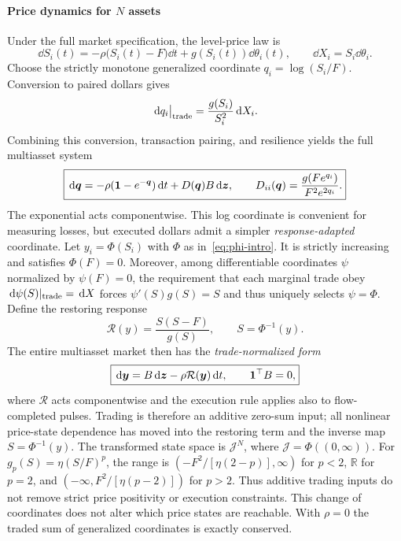 \documentclass[review,hidelinks,onefignum,onetabnum]{siamonline250211}
\begin{document}
\paragraph{Price dynamics for $N$ assets} Under the full market specification, the level-price law is
\begin{equation}\label{eq:level-dynamics}
\boxed{\dd S_i(t)=-\rho\big(S_i(t)-F\big)\dd t+g(S_i(t))\dd\theta_i(t),\qquad \dd X_i=S_i\dd\theta_i.}
\end{equation}
Choose the strictly monotone generalized coordinate $q_i=\log(S_i/F)$. Conversion to paired dollars gives
\begin{equation}\label{eq:log-impact}
\,\mathrm{d} q_i\big|_{\rm trade}=\frac{g(S_i)}{S_i^2}\,\mathrm{d} X_i.
\end{equation}
Combining this conversion, transaction pairing, and resilience yields the full multiasset system
\begin{equation}\label{eq:master}
\boxed{\,\mathrm{d}\bm q=-\rho(\mathbf{1}-e^{-\bm q})\,\mathrm{d} t+D(\bm q)B\,\mathrm{d}\bm z,\qquad
D_{ii}(\bm q)=\frac{g(Fe^{q_i})}{F^2e^{2q_i}}.}
\end{equation}
The exponential acts componentwise. This log coordinate is convenient for measuring losses, but executed dollars admit a simpler \emph{response-adapted} coordinate. Let $y_i=\Phi(S_i)$ with $\Phi$ as in~\eqref{eq:phi-intro}. It is strictly increasing and satisfies $\Phi(F)=0$. Moreover, among differentiable coordinates $\psi$ normalized by $\psi(F)=0$, the requirement that each marginal trade obey $\,\mathrm{d}\psi(S)|_{\rm trade}=\,\mathrm{d} X$ forces $\psi'(S)g(S)=S$ and thus uniquely selects $\psi=\Phi$. Define the restoring response
\[
\mathcal R(y)=\frac{S(S-F)}{g(S)},\qquad S=\Phi^{-1}(y).
\]
The entire multiasset market then has the \emph{trade-normalized form}
\begin{equation}\label{eq:normal-form}
\boxed{\,\mathrm{d}\bm y=B\,\mathrm{d}\bm z-\rho\mathcal R(\bm y)\,\mathrm{d} t,\qquad\mathbf{1}^\top B=0,}
\end{equation}
where $\mathcal R$ acts componentwise and the execution rule applies also to flow-completed pulses. Trading is therefore an additive zero-sum input; all nonlinear price-state dependence has moved into the restoring term and the inverse map $S=\Phi^{-1}(y)$. The transformed state space is $\mathcal J^N$, where $\mathcal J=\Phi((0,\infty))$. For $g_p(S)=\eta(S/F)^p$, the range is $(-F^2/[\eta(2-p)],\infty)$ for $p<2$, $\mathbb R$ for $p=2$, and $(-\infty,F^2/[\eta(p-2)])$ for $p>2$. Thus additive trading inputs do not remove strict price positivity or execution constraints. This change of coordinates does not alter which price states are reachable. With $\rho=0$ the traded sum of generalized coordinates is exactly conserved.
\end{document}

